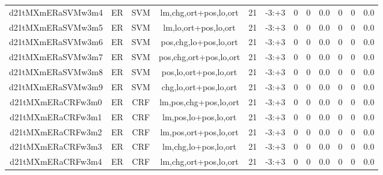 \documentclass[a4paper]{article}
\begin{document}
\begin{landscape}
\begin{center}
\begin{tabular}{ |c|c|c|c|c|c|c|c|c|c|c|c|}
 
 	
 	\small{ d21tMXmERaSVMw3m4 } & ER & SVM & lm,chg,ort+pos,lo,ort  &  21 &  -3:+3  &  0 & 0 & 0.0  &  0 & 0 & 0.0 \\
 	

 
 	
 	\small{ d21tMXmERaSVMw3m5 } & ER & SVM & lm,lo,ort+pos,lo,ort  &  21 &  -3:+3  &  0 & 0 & 0.0  &  0 & 0 & 0.0 \\
 	

 
 	
 	\small{ d21tMXmERaSVMw3m6 } & ER & SVM & pos,chg,lo+pos,lo,ort  &  21 &  -3:+3  &  0 & 0 & 0.0  &  0 & 0 & 0.0 \\
 	

 
 	
 	\small{ d21tMXmERaSVMw3m7 } & ER & SVM & pos,chg,ort+pos,lo,ort  &  21 &  -3:+3  &  0 & 0 & 0.0  &  0 & 0 & 0.0 \\
 	

 
 	
 	\small{ d21tMXmERaSVMw3m8 } & ER & SVM & pos,lo,ort+pos,lo,ort  &  21 &  -3:+3  &  0 & 0 & 0.0  &  0 & 0 & 0.0 \\
 	

 
 	
 	\small{ d21tMXmERaSVMw3m9 } & ER & SVM & chg,lo,ort+pos,lo,ort  &  21 &  -3:+3  &  0 & 0 & 0.0  &  0 & 0 & 0.0 \\
 	

 
 	
 	\small{ d21tMXmERaCRFw3m0 } & ER & CRF & lm,pos,chg+pos,lo,ort  &  21 &  -3:+3  &  0 & 0 & 0.0  &  0 & 0 & 0.0 \\
 	

 
 	
 	\small{ d21tMXmERaCRFw3m1 } & ER & CRF & lm,pos,lo+pos,lo,ort  &  21 &  -3:+3  &  0 & 0 & 0.0  &  0 & 0 & 0.0 \\
 	

 
 	
 	\small{ d21tMXmERaCRFw3m2 } & ER & CRF & lm,pos,ort+pos,lo,ort  &  21 &  -3:+3  &  0 & 0 & 0.0  &  0 & 0 & 0.0 \\
 	

 
 	
 	\small{ d21tMXmERaCRFw3m3 } & ER & CRF & lm,chg,lo+pos,lo,ort  &  21 &  -3:+3  &  0 & 0 & 0.0  &  0 & 0 & 0.0 \\
 	

 
 	
 	\small{ d21tMXmERaCRFw3m4 } & ER & CRF & lm,chg,ort+pos,lo,ort  &  21 &  -3:+3  &  0 & 0 & 0.0  &  0 & 0 & 0.0 \\
 	


\end{tabular}
\end{center}
\end{landscape}
\end{document}
